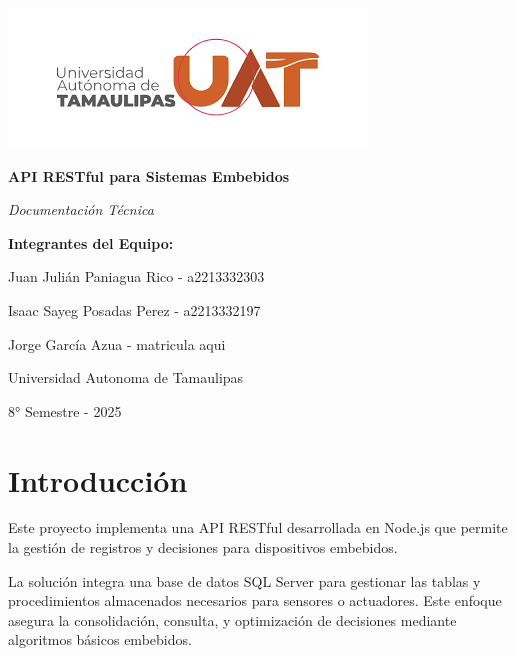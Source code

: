 \documentclass[12pt]{article}
\begin{document}
\begin{titlepage}
    \begin{center}
        \vspace*{1cm}
        \includegraphics{logo_uat}
        
        \vspace{2cm}
        {\huge\bfseries API RESTful para Sistemas Embebidos\par}
        \vspace{1cm}
        {\Large\itshape Documentación Técnica\par}
        
        \vspace{2cm}
        {\large\bfseries Integrantes del Equipo:\par}
        \vspace{0.5cm}
        {\large Juan Julián Paniagua Rico - a2213332303\par}
        {\large Isaac Sayeg Posadas Perez - a2213332197\par}
        {\large Jorge García Azua - matricula aqui\par}
        
        \vfill
        {\large Universidad Autonoma de Tamaulipas\par}
        {\large 8° Semestre - 2025\par}
    \end{center}
\end{titlepage}

\tableofcontents
\newpage

\section{Introducción}
Este proyecto implementa una API RESTful desarrollada en Node.js que permite la gestión de registros y decisiones para dispositivos embebidos. 

La solución integra una base de datos SQL Server para gestionar las tablas y procedimientos almacenados necesarios para sensores o actuadores. Este enfoque asegura la consolidación, consulta, y optimización de decisiones mediante algoritmos básicos embebidos.
\end{document}
